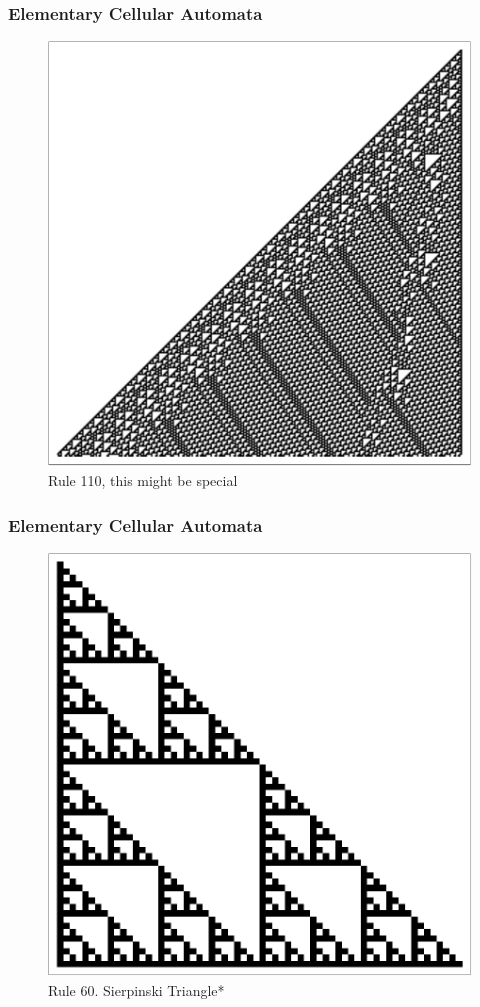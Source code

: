 \documentclass{beamer}
\begin{document}
\begin{frame}
    \frametitle{Elementary Cellular Automata}
    \begin{figure}
        \centering
        \includegraphics[scale=0.43]{fig4.pdf}
        \caption{Rule 110, this might be special}
    \end{figure}
\end{frame}

\begin{frame}
    \frametitle{Elementary Cellular Automata}
    \begin{figure}
        \includegraphics[scale=0.43]{seir.pdf}
        \caption{Rule 60. Sierpinski Triangle*}
    \end{figure}
\end{frame}
\end{document}

